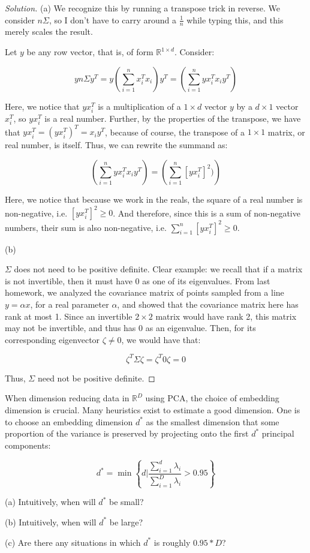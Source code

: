 \documentclass[10pt]{article}
\newenvironment{problem}[2][]{\begin{trivlist}
\item[\hskip \labelsep {\bfseries #1}\hskip \labelsep {\bfseries #2.}]}{\end{trivlist}}
\begin{document}
\begin{proof}[Solution]

(a) We recognize this by running a transpose trick in reverse. We consider $n \Sigma$, so I don't have to carry around a $\frac{1}{n}$ while typing this, and this merely scales the result.

Let $y$ be any row vector, that is, of form $\mathbb{R}^{1 \times d}$. Consider:

$$ y n\Sigma y^T = y\left( \sum_{i=1}^n x_i^T x_i \right) y^T = \left( \sum_{i=1}^n y x_i^T x_i y^T \right)$$

Here, we notice that $y x_i^T$ is a multiplication of a $1 \times d$ vector $y$ by a $d \times 1$ vector $x_i^T$, so $y x_i^T$ is a real number. Further, by the properties of the transpose, we have that $y x_i^T = (y x_i^T)^T = x_i y^T$, because of course, the transpose of a $1 \times 1$ matrix, or real number, is itself. Thus, we can rewrite the summand as:

$$  \left( \sum_{i=1}^n y x_i^T x_i y^T\right) =  \left( \sum_{i=1}^n [y x_i^T]^2) \right) $$

Here, we notice that because we work in the reals, the square of a real number is non-negative, i.e. $ [y x_i^T]^2 \geq 0$. And therefore, since this is a sum of non-negative numbers, their sum is also non-negative, i.e. $\sum_{i=1}^n  [y x_i^T]^2 \geq 0$.

(b)

$\Sigma$ does not need to be positive definite. Clear example: we recall that if a matrix is not invertible, then it must have 0 as one of its eigenvalues. From last homework, we analyzed the covariance matrix of points sampled from a line $y = \alpha x$, for a real parameter $\alpha$, and showed that the covariance matrix here has rank at most 1. Since an invertible $2 \times 2$ matrix would have rank 2, this matrix may not be invertible, and thus has $0$ as an eigenvalue. Then, for its corresponding eigenvector $\zeta \not = 0$, we would have that:

$$ \zeta^T \Sigma \zeta = \zeta^T 0 \zeta = 0 $$

Thus, $\Sigma$ need not be positive definite.

\end{proof}

\begin{problem}{Question 4}

When dimension reducing data in $\mathbb{R}^D$ using PCA, the choice of embedding dimension is crucial. Many heuristics exist to estimate a good dimension. One is to choose an embedding dimension $d^*$ as the smallest dimension that some proportion of the variance is preserved by projecting onto the first $d^*$ principal components:

$$ d^* = \min \left\{ d \Big| \frac{\sum_{i=1}^d \lambda_i}{\sum_{i=1}^D \lambda_i} > 0.95 \right\} $$

(a) Intuitively, when will $d^*$ be small?

(b) Intuitively, when will $d^*$ be large?

(c) Are there any situations in which $d^*$ is roughly $0.95* D$?
\end{problem}
\end{document}
